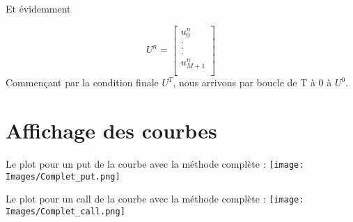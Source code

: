 \documentclass[a4paper, 12pt]{article}
\begin{document}
Et évidemment 

\[
U^{n} =
\left[ {\begin{array}{c}
        u^{n}_0\\
        .\\
        .\\
        .\\
        u^{n}_{M+1}\\
\end{array} } \right]
\]
Commençant par la condition finale $U^T$, nous arrivons par boucle de T à 0 à $U^0$.




\newpage
\section{Affichage des courbes}

Le plot pour un put de la courbe avec la méthode complète :
\texttt{[image: Images/Complet\_put.png]} 


Le plot pour un call de la courbe avec la méthode complète :
\texttt{[image: Images/Complet\_call.png]} 
\end{document}
